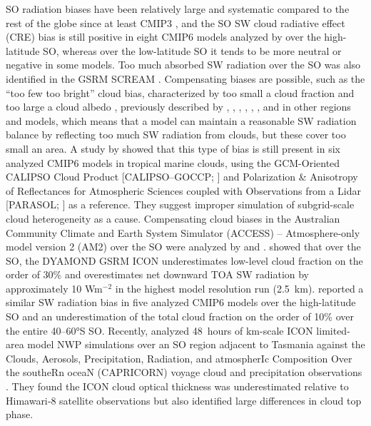 \documentclass[draft]{agujournal2019}
\begin{document}
SO radiation biases have been relatively large and systematic compared to the rest of the globe since at least CMIP3 \cite{trenberth2010,bodas-salcedo2012}, and the SO SW cloud radiative effect (CRE) bias is still positive in eight CMIP6 models analyzed by  over the high-latitude SO, whereas over the low-latitude SO it tends to be more neutral or negative in some models. Too much absorbed SW radiation over the SO was also identified in the GSRM SCREAM \cite{caldwell2021}. Compensating biases are possible, such as the ``too few too bright'' cloud bias, characterized by too small a cloud fraction and too large a cloud albedo \cite{wall2017,kuma2020}, previously described by , , , , , , and  in other regions and models, which means that a model can maintain a reasonable SW radiation balance by reflecting too much SW radiation from clouds, but these cover too small an area. A study by  showed that this type of bias is still present in six analyzed CMIP6 models in tropical marine clouds, using the GCM-Oriented CALIPSO Cloud Product [CALIPSO--GOCCP; ] and Polarization \& Anisotropy of Reflectances for Atmospheric Sciences coupled with Observations from a Lidar [PARASOL; ] as a reference. They suggest improper simulation of subgrid-scale cloud heterogeneity as a cause. Compensating cloud biases in the Australian Community Climate and Earth System Simulator (ACCESS) – Atmosphere-only model version 2 (AM2) over the SO were analyzed by  and .  showed that over the SO, the DYAMOND GSRM ICON underestimates low-level cloud fraction on the order of 30\% and overestimates net downward TOA SW radiation by approximately 10 Wm$^\mathrm{-2}$ in the highest model resolution run (2.5~km).  reported a similar SW radiation bias in five analyzed CMIP6 models over the high-latitude SO and an underestimation of the total cloud fraction on the order of 10\% over the entire 40--60°S SO. Recently,  analyzed 48~hours of km-scale ICON limited-area model NWP simulations over an SO region adjacent to Tasmania against the Clouds, Aerosols, Precipitation, Radiation, and atmospherIc Composition Over the southeRn oceaN (CAPRICORN) voyage cloud and precipitation observations \cite{mcfarquhar2021}. They found the ICON cloud optical thickness was underestimated relative to Himawari‐8 satellite observations but also identified large differences in cloud top phase.
\end{document}
